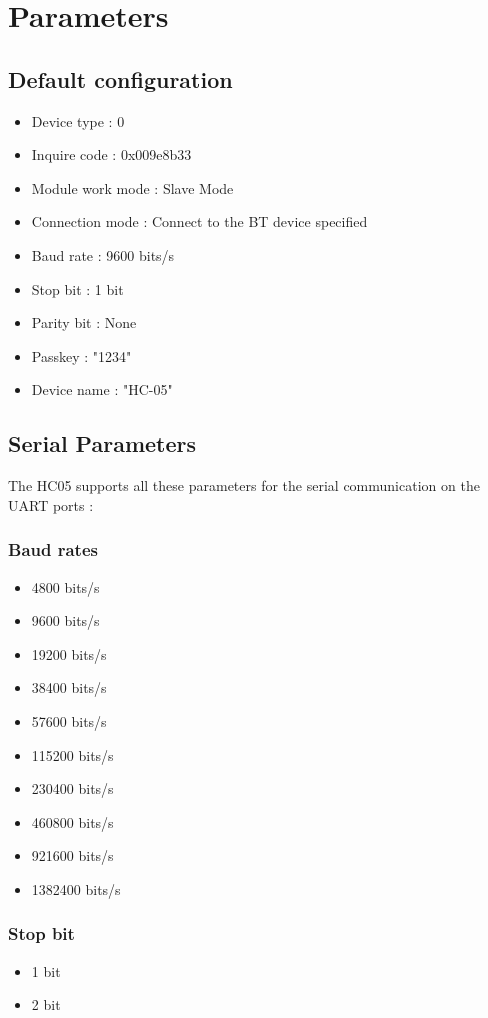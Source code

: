 \documentclass[11pt]{article}
\begin{document}
\section{Parameters}

\subsection{Default configuration}
\begin{itemize}
    \item Device type : 0
    \item Inquire code : 0x009e8b33
    \item Module work mode : Slave Mode
    \item Connection mode : Connect to the BT device specified
    \item Baud rate : 9600 bits/s
    \item Stop bit : 1 bit
    \item Parity bit : None
    \item Passkey : "1234"
    \item Device name : "HC-05"
\end{itemize}

\subsection{Serial Parameters}
The HC05 supports all these parameters for the serial communication on the UART ports :
\subsubsection{Baud rates}
\begin{itemize}
    \item 4800 bits/s
    \item 9600 bits/s
    \item 19200 bits/s
    \item 38400 bits/s
    \item 57600 bits/s
    \item 115200 bits/s
    \item 230400 bits/s
    \item 460800 bits/s
    \item 921600 bits/s
    \item 1382400 bits/s
\end{itemize}

\subsubsection{Stop bit}
\begin{itemize}
    \item 1 bit
    \item 2 bit
\end{itemize}
\end{document}
